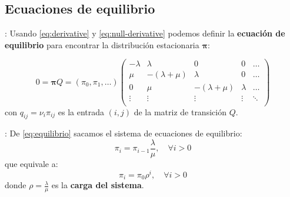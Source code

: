 \documentclass[xcolor={x11names}]{beamer}
\begin{document}
\subsection{Ecuaciones de equilibrio}

\begin{frame}{\secname: \subsecname}
    Usando \eqref{eq:derivative}
    y \eqref{eq:null-derivative} podemos
    definir la \textbf{ecuación de equilibrio}
    para encontrar la distribución estacionaria
    $\pmb{\pi}$:

    \begin{equation}
        0 = \pmb{\pi}Q = 
        (\pi_0, \pi_1, \ldots)
        \begin{pmatrix}
            -\lambda & \lambda & 0 & 0 & \ldots \\
            \mu & -(\lambda+\mu) & \lambda & 0 & \ldots \\
            0  & \mu & -(\lambda+\mu) & \lambda &  \ldots \\
            \vdots  & \vdots & \vdots & \vdots &  \ddots \\
        \end{pmatrix}
        \label{eq:equilibrio}
    \end{equation}
    con $q_{ij}=\nu_i \pi_{i j}$ es la entrada
    $(i,j)$ de la matriz de transición $Q$.

\end{frame}






\begin{frame}{\secname: \subsecname}
    De \eqref{eq:equilibrio} sacamos
    el sistema de ecuaciones de equilibrio:
    \begin{equation}
        \pi_i = \pi_{i-1} \frac{\lambda}{\mu},
        \quad \forall i>0
        \label{eq:equilibrio}
    \end{equation}
    que equivale a:
    \begin{equation}
        \pi_i = \pi_0 \rho^i, \quad \forall i>0
        \label{eq:equilibrio-potencia}
    \end{equation}
    donde $\rho=\tfrac{\lambda}{\mu}$
    es la \textbf{carga del sistema}.
\end{frame}
\end{document}
